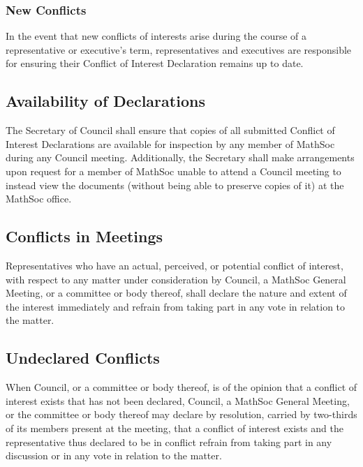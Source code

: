 \subsubsection{New Conflicts}
In the event that new conflicts of interests arise during the course of a representative or executive's term, representatives and executives are responsible for ensuring their Conflict of Interest Declaration remains up to date.

\subsection{Availability of Declarations}
The Secretary of Council shall ensure that copies of all submitted Conflict of Interest Declarations are available for inspection by any member of MathSoc during any Council meeting. Additionally, the Secretary shall make arrangements upon request for a member of MathSoc unable to attend a Council meeting to instead view the documents (without being able to preserve copies of it) at the MathSoc office.

\subsection{Conflicts in Meetings}
Representatives who have an actual, perceived, or potential conflict of interest, with respect to any matter under consideration by Council, a MathSoc General Meeting, or a committee or body thereof, shall declare the nature and extent of the interest immediately and refrain from taking part in any vote in relation to the matter.

\subsection{Undeclared Conflicts}
When Council, or a committee or body thereof, is of the opinion that a conflict of interest exists that has not been declared, Council, a MathSoc General Meeting, or the committee or body thereof may declare by resolution, carried by two-thirds of its members present at the meeting, that a conflict of interest exists and the representative thus declared to be in conflict refrain from taking part in any discussion or in any vote in relation to the matter.
